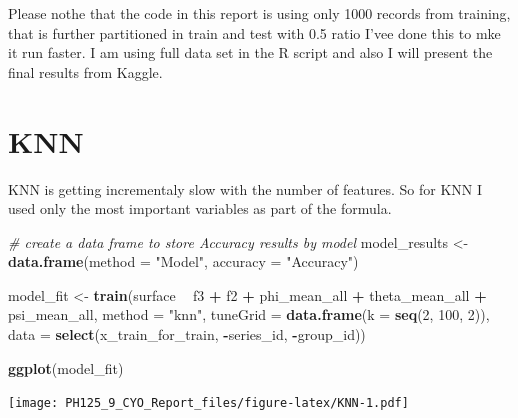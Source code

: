 \documentclass[]{article}
\newenvironment{Shaded}{\begin{snugshade}}{\end{snugshade}}
\newcommand{\CommentTok}[1]{\textcolor[rgb]{0.56,0.35,0.01}{\textit{#1}}}
\newcommand{\DataTypeTok}[1]{\textcolor[rgb]{0.13,0.29,0.53}{#1}}
\newcommand{\DecValTok}[1]{\textcolor[rgb]{0.00,0.00,0.81}{#1}}
\newcommand{\KeywordTok}[1]{\textcolor[rgb]{0.13,0.29,0.53}{\textbf{#1}}}
\newcommand{\NormalTok}[1]{#1}
\newcommand{\OperatorTok}[1]{\textcolor[rgb]{0.81,0.36,0.00}{\textbf{#1}}}
\newcommand{\StringTok}[1]{\textcolor[rgb]{0.31,0.60,0.02}{#1}}
\begin{document}
Please nothe that the code in this report is using only 1000 records
from training, that is further partitioned in train and test with 0.5
ratio I'vee done this to mke it run faster. I am using full data set in
the R script and also I will present the final results from Kaggle.

\hypertarget{knn}{%
\section{KNN}\label{knn}}

KNN is getting incrementaly slow with the number of features. So for KNN
I used only the most important variables as part of the formula.

\begin{Shaded}
\begin{Highlighting}[]
\CommentTok{# create a data frame to store Accuracy results by model}
\NormalTok{model_results <-}\StringTok{ }\KeywordTok{data.frame}\NormalTok{(}\DataTypeTok{method =} \StringTok{"Model"}\NormalTok{, }\DataTypeTok{accuracy =} \StringTok{"Accuracy"}\NormalTok{)}

\NormalTok{model_fit <-}\StringTok{ }\KeywordTok{train}\NormalTok{(surface }\OperatorTok{~}\StringTok{ }\NormalTok{f3 }\OperatorTok{+}\StringTok{ }\NormalTok{f2 }\OperatorTok{+}\StringTok{ }\NormalTok{phi_mean_all }\OperatorTok{+}\StringTok{ }\NormalTok{theta_mean_all }\OperatorTok{+}\StringTok{ }\NormalTok{psi_mean_all,  }\DataTypeTok{method =} \StringTok{"knn"}\NormalTok{, }
             \DataTypeTok{tuneGrid =} \KeywordTok{data.frame}\NormalTok{(}\DataTypeTok{k =} \KeywordTok{seq}\NormalTok{(}\DecValTok{2}\NormalTok{, }\DecValTok{100}\NormalTok{, }\DecValTok{2}\NormalTok{)), }
             \DataTypeTok{data =} \KeywordTok{select}\NormalTok{(x_train_for_train, }\OperatorTok{-}\NormalTok{series_id, }\OperatorTok{-}\NormalTok{group_id))}

\KeywordTok{ggplot}\NormalTok{(model_fit) }
\end{Highlighting}
\end{Shaded}

\texttt{[image: PH125\_9\_CYO\_Report\_files/figure-latex/KNN-1.pdf]}

\begin{Shaded}
\end{Shaded}
\end{document}
